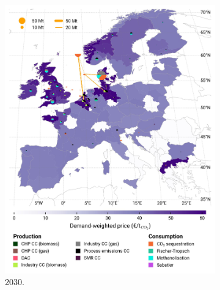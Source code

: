 \documentclass[final,5p,times,twocolumn,sort&compress]{elsarticle}
\begin{document}
\begin{figure}[htbp]
\begin{subfigure}[t]{0.4\textwidth}
      \includegraphics[width=1\textwidth,trim=0cm 3.2cm 0cm 0cm, clip]{maps/pcipmi/base_s_adm___2030-balance_map_co2_stored} 
      \vspace{-0.5cm}
      \caption{ 2030.}
      \label{fig:PCI_lt_2030_co2}
  \end{subfigure}
  \begin{subfigure}[t]{0.4\textwidth}
      \vspace{0pt}

\end{subfigure}
\end{figure}
\end{document}
